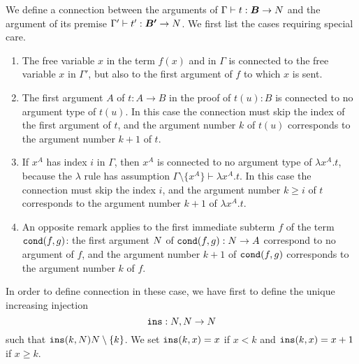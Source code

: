 %
%


We define a connection between the arguments of $\Gamma \vdash t:\vec{B} 
\rightarrow \N$ and the argument of its premise $\Gamma' \vdash t':\vec{B'} 
\rightarrow \N$. We first list the cases requiring special care.
\begin{enumerate}
\item
The free variable $x$ in the term $f(x)$ and in 
$\Gamma$ is connected to the free variable $x$ in $\Gamma'$, but also to the first 
argument of $f$ to which $x$ is sent.
\item
The first argument $A$ of $t:A \rightarrow B$ in the proof of $t(u):B$ is connected 
to no argument type of $t(u)$.
In this case the connection must skip the index of the first argument of $t$,
and the argument number $k$ of $t(u)$ corresponds to the argument number 
$k+1$ of $t$. 
\item
If $x^A$ has index $i$ in $\Gamma$, then $x^A$ is connected 
to no argument type of $\lambda x^A.t$, because the $\lambda$ rule
has assumption $\Gamma \setminus \{x^A\} \vdash \lambda x^A.t$.
In this case the connection must skip the index $i$,
and the argument number $k \ge i $ of $t$ 
corresponds to the argument number $k+1$ of $ \lambda x^A.t$. 
\item
An opposite remark applies to the first immediate subterm $f$ of the
term ${\tt cond}(f,g)$:  the first argument ${N}$ of ${\tt cond}(f,g):{N} \rightarrow A$
correspond to no argument of $f$, and the argument number $k+1$ of 
${\tt cond}(f,g)$ corresponds to the argument number $k$ of $f$. 
\end{enumerate}
In order to define connection in these case, we have first to define the unique
increasing injection 
\[
{\tt ins}:{N},{N} \rightarrow{N}
\]
such that ${\tt ins}(k,{N}) {N} \setminus \{k\}$. 
We set ${\tt ins}(k,x)=x$ if $x < k$ and ${\tt ins}(k,x)=x+1$ if $x \ge k$. 

